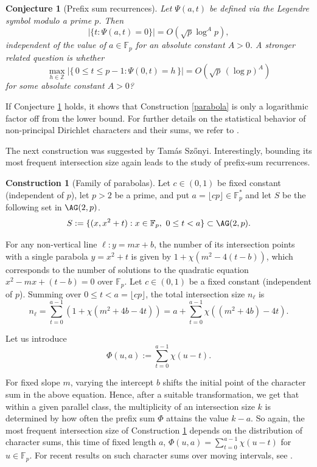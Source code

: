 \documentclass[10pt]{article}
\newcommand{\F}{\mathbb{F}}
\newtheorem{conj}[thm]{Conjecture}
\theoremstyle{definition}
\newtheorem{construction}[thm]{Construction}
\begin{document}
	\begin{conj}[Prefix sum recurrences]\label{returns}
		Let $\Psi(a,t)$ be defined via the Legendre symbol modulo a prime $p$.
		Then $$| \{t: \Psi(a,t)=0\} |= O(\sqrt{p}\log^A p),$$ independent of the value of $a\in \F_p$ for an absolute constant $A>0$.
		A stronger related question is whether
		\[
		\max_{h\in\mathbb Z}
		\bigl|\{\,0\le t\le p-1:\Psi(0,t)=h\,\}\bigr|=
		O( \sqrt p\,(\log p)^A)
		\]
		for some absolute constant $A>0$?
	\end{conj}
	
	
	
	If  Conjecture \ref{returns} holds, it shows that  Construction \ref{parabola} is only a logarithmic factor off from the lower bound. For further details on the statistical behavior of non-principal Dirichlet characters and their sums, we refer to \cite{char_sum}.
	
	
	The next construction was suggested by Tam\'as Sz\H onyi. Interestingly, bounding its most frequent intersection size again leads to the study of prefix-sum recurrences. 
	
	\begin{construction}[Family of parabolas]\label{parabola2}
		Let \(c\in(0,1)\) be fixed constant (independent of \(p\)), let \(p>2\) be a prime,
		and put  $a=\lfloor cp\rfloor \in \F^*_p$ and let $S$ be the following set in $\AG(2, p)$.
		\[
		S:=\{(x,x^2+t): x\in\mathbb F_p,\ 0\le t<a\}\subset \AG(2,p).
		\]
	\end{construction}
	
	For any non-vertical line $\ell: y = mx + b$, the number of its intersection points with a single parabola $y = x^2 + t$ is given by $1 + \chi(m^2 - 4(t - b))$, which corresponds to the number of solutions to the quadratic equation $x^2 - mx + (t - b) = 0$ over $\mathbb{F}_p$. Let $c\in (0,1)$ be a fixed constant (independent of $p$). Summing over \(0\leq t<a=\lfloor cp\rfloor\), the total intersection size $n_{\ell}$ is
	\begin{equation}
		n_{\ell} = \sum_{t=0}^{a-1} (1 + \chi(m^2 + 4b - 4t)) = a + \sum_{t=0}^{a-1} \chi((m^2 + 4b) - 4t).
	\end{equation}
	
	Let us introduce $$\Phi(u,a):=\sum_{t=0}^{a-1} \chi(u-t).$$
	
	For fixed slope $m$, varying the intercept $b$ shifts the initial point of the character sum in the above equation. Hence, after a suitable transformation, we get that within a given parallel class, the multiplicity of an intersection size $k$ is determined by how often the prefix sum $\Phi$ attains the value $k - a$. %
	{So again, the most frequent intersection size of Construction \ref{parabola2} depends on the distribution of character sums, this time of fixed length $a$,  $\Phi(u,a)=\sum_{t=0}^{a-1} \chi(u - t)$ for $u\in \F_p$. For  recent results on such character sums over moving intervals, see \cite{Harper1, Huss}.}
	
\end{document}
